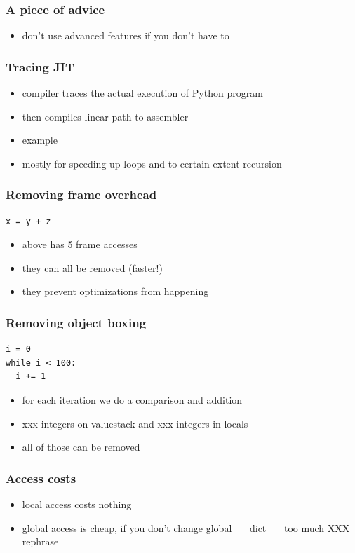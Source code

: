 \documentclass[utf8x, 14pt]{beamer}
\begin{document}
\begin{frame}
  \frametitle{A piece of advice}
  \begin{itemize}
    \item don't use advanced features if you don't have to
  \end{itemize}
\end{frame}

\begin{frame}
  \frametitle{Tracing JIT}
  \begin{itemize}
    \item compiler traces the actual execution of Python program
    \item then compiles linear path to assembler
    \item example
    \item mostly for speeding up loops and to certain extent
      recursion
  \end{itemize}
\end{frame}

\begin{frame}[fragile]
  \frametitle{Removing frame overhead}
  \begin{verbatim}
x = y + z
  \end{verbatim}
  \begin{itemize}
    \item above has 5 frame accesses
    \item they can all be removed (faster!)
      \pause
    \item they prevent optimizations from happening
  \end{itemize}
\end{frame}

\begin{frame}[fragile]
  \frametitle{Removing object boxing}
  \begin{verbatim}
i = 0
while i < 100:
  i += 1
  \end{verbatim}
  \begin{itemize}
    \item for each iteration we do a comparison and addition
    \item xxx integers on valuestack and xxx integers in locals
    \item all of those can be removed
  \end{itemize}
\end{frame}

\begin{frame}
  \frametitle{Access costs}
  \begin{itemize}
    \item local access costs nothing
    \item global access is cheap, if you don't change global {\ttfamily \_\_dict\_\_} too much XXX rephrase
  \end{itemize}
\end{frame}
\end{document}
